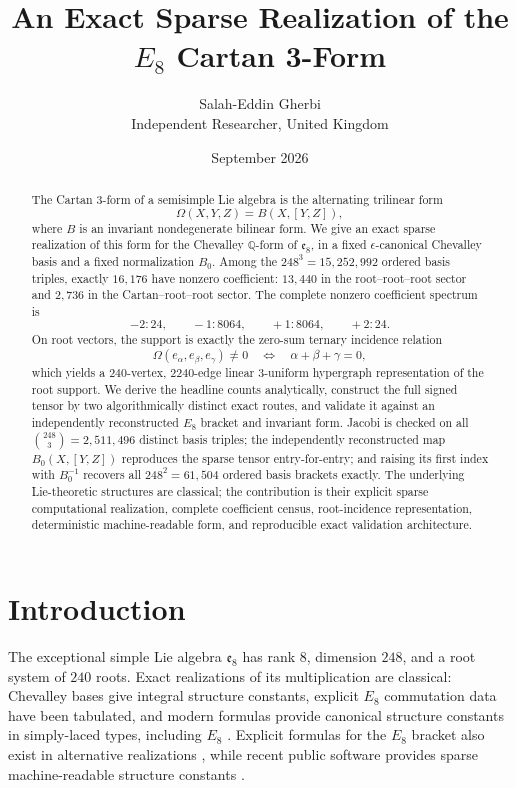 \documentclass[11pt]{article}
\title{\textbf{An Exact Sparse Realization of the $E_8$ Cartan 3-Form}}
\author{Salah-Eddin Gherbi\\Independent Researcher, United Kingdom}
\date{September 2026}
\theoremstyle{definition}
\theoremstyle{remark}
\newcommand{\e}{\mathfrak e}
\begin{document}
\maketitle

\begin{abstract}
The Cartan 3-form of a semisimple Lie algebra is the alternating trilinear form
\[
\Omega(X,Y,Z)=B(X,[Y,Z]),
\]
where $B$ is an invariant nondegenerate bilinear form.  We give an exact sparse realization of this form for the Chevalley $\mathbb Q$-form of $\mathfrak e_8$, in a fixed $\epsilon$-canonical Chevalley basis and a fixed normalization $B_0$.  Among the $248^3=15{,}252{,}992$ ordered basis triples, exactly $16{,}176$ have nonzero coefficient: $13{,}440$ in the root--root--root sector and $2{,}736$ in the Cartan--root--root sector.  The complete nonzero coefficient spectrum is
\[
-2:24,\qquad -1:8064,\qquad +1:8064,\qquad +2:24.
\]
On root vectors, the support is exactly the zero-sum ternary incidence relation
\[
\Omega(e_\alpha,e_\beta,e_\gamma)\neq0
\quad\Longleftrightarrow\quad
\alpha+\beta+\gamma=0,
\]
which yields a $240$-vertex, $2240$-edge linear $3$-uniform hypergraph representation of the root support.  We derive the headline counts analytically, construct the full signed tensor by two algorithmically distinct exact routes, and validate it against an independently reconstructed $E_8$ bracket and invariant form.  Jacobi is checked on all $\binom{248}{3}=2{,}511{,}496$ distinct basis triples; the independently reconstructed map $B_0(X,[Y,Z])$ reproduces the sparse tensor entry-for-entry; and raising its first index with $B_0^{-1}$ recovers all $248^2=61{,}504$ ordered basis brackets exactly.  The underlying Lie-theoretic structures are classical; the contribution is their explicit sparse computational realization, complete coefficient census, root-incidence representation, deterministic machine-readable form, and reproducible exact validation architecture.
\end{abstract}

\section{Introduction}

The exceptional simple Lie algebra $\e_8$ has rank $8$, dimension $248$, and a root system of $240$ roots.  Exact realizations of its multiplication are classical: Chevalley bases give integral structure constants, explicit $E_8$ commutation data have been tabulated, and modern formulas provide canonical structure constants in simply-laced types, including $E_8$ \cite{Djokovic2000,GeckLang2025}.  Explicit formulas for the $E_8$ bracket also exist in alternative realizations \cite{Kollross2025}, while recent public software provides sparse machine-readable structure constants \cite{McGirl2026}.
\end{document}
